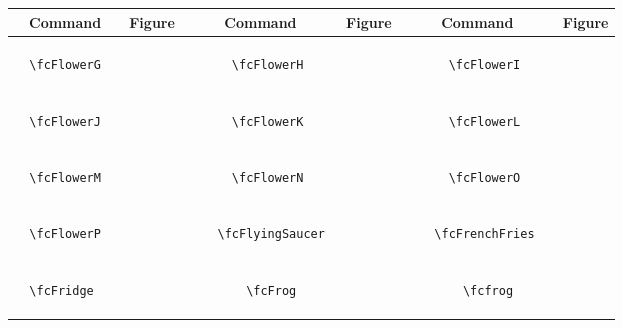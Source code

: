 \documentclass[x11names]{article}
\begin{document}
\begin{table}[H]\centering\begin{tabular}{|c|c|c|c|c|c|}\hline{\bf Command} & {\bf Figure} & {\bf Command} & {\bf Figure} & {\bf Command} & {\bf Figure}\\	\hline	&\multirow{5}{*}{	\fcFlowerG	[scale=0.4]} & &\multirow{5}{*}{	\fcFlowerH	[scale=0.4]} & &\multirow{5}{*}{	\fcFlowerI	[scale=0.4]}\\	& & & & & \\	& & & & & \\	\verb|	\fcFlowerG	| & & \verb|	\fcFlowerH	| & & \verb|	\fcFlowerI	| & \\	& & & & & \\	& & & & & \\	& & & & & \\	\hline									
		&\multirow{5}{*}{	\fcFlowerJ	[scale=0.4]} & &\multirow{5}{*}{	\fcFlowerK	[scale=0.4]} & &\multirow{5}{*}{	\fcFlowerL	[scale=0.4]}\\	& & & & & \\	& & & & & \\	\verb|	\fcFlowerJ	| & & \verb|	\fcFlowerK	| & & \verb|	\fcFlowerL	| & \\	& & & & & \\	& & & & & \\	& & & & & \\	\hline									
		&\multirow{5}{*}{	\fcFlowerM	[scale=0.4]} & &\multirow{5}{*}{	\fcFlowerN	[scale=0.4]} & &\multirow{5}{*}{	\fcFlowerO	[scale=0.4]}\\	& & & & & \\	& & & & & \\	\verb|	\fcFlowerM	| & & \verb|	\fcFlowerN	| & & \verb|	\fcFlowerO	| & \\	& & & & & \\	& & & & & \\	& & & & & \\	\hline									
		&\multirow{5}{*}{	\fcFlowerP	[scale=0.4]} & &\multirow{5}{*}{	\fcFlyingSaucer	[scale=0.8]} & &\multirow{5}{*}{	\fcFrenchFries	[scale=0.4]}\\	& & & & & \\	& & & & & \\	\verb|	\fcFlowerP	| & & \verb|	\fcFlyingSaucer	| & & \verb|	\fcFrenchFries	| & \\	& & & & & \\	& & & & & \\	& & & & & \\	\hline									
		&\multirow{5}{*}{	\fcFridge	[scale=0.4]} & &\multirow{5}{*}{	\fcFrog	[scale=0.8]} & &\multirow{5}{*}{	\fcfrog	[scale=0.4]}\\	& & & & & \\	& & & & & \\	\verb|	\fcFridge	| & & \verb|	\fcFrog	| & & \verb|	\fcfrog	| & \\	& & & & & \\	& & & & & \\	& & & & & \\	\hline									

\end{tabular}
\end{table}
\end{document}
